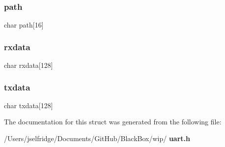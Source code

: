 \mbox{\label{structuart__struct_ace45f567511d3f9ff978c679ae38b5b0}} 
\subsubsection{path}
{\footnotesize\ttfamily char path[16]}

\mbox{\label{structuart__struct_a7fefb81a44dab5191213b2762bcb24b2}} 
\subsubsection{rxdata}
{\footnotesize\ttfamily char rxdata[128]}

\mbox{\label{structuart__struct_a98066319e47cdf03f9c7b543723199c5}} 
\subsubsection{txdata}
{\footnotesize\ttfamily char txdata[128]}



The documentation for this struct was generated from the following file\+:\begin{DoxyCompactItemize}
\item 
/\+Users/jselfridge/\+Documents/\+Git\+Hub/\+Black\+Box/wip/\textbf{ uart.\+h}\end{DoxyCompactItemize}
